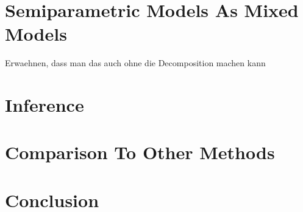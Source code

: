 \documentclass[12pt]{article}
\begin{document}
\section{Semiparametric Models As Mixed Models}

Erwaehnen, dass man das auch ohne die Decomposition machen kann

\section{Inference}

\section{Comparison To Other Methods}

\section{Conclusion}





\newpage
\printbibliography
\end{document}
